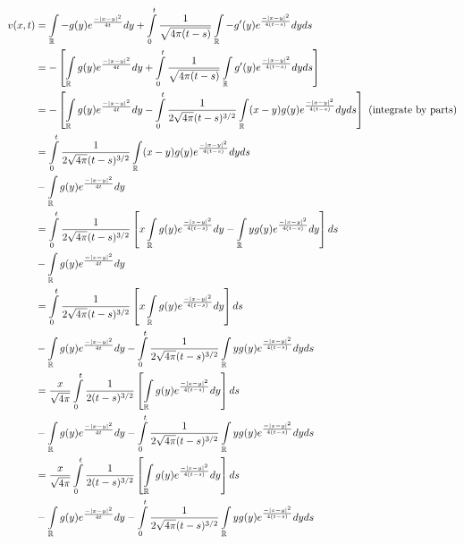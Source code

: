 \documentclass[a4paper,12pt]{article}
\begin{document}
\begin{align*}
v(x,t) &= \int\limits_{\mathbb{R}} -g(y)e^{\frac{-\left\lvert x-y \right\rvert^2}{4t}} dy +  \int\limits_0^t \frac{1}{\sqrt{4 \pi (t-s)}} \int\limits_{\mathbb{R}} -g'(y) e^{\frac{-\left\lvert x-y \right\rvert^2}{4(t-s)}} dy ds\\
&= -\left[\int\limits_{\mathbb{R}} g(y)e^{\frac{-\left\lvert x-y \right\rvert^2}{4t}} dy +  \int\limits_0^t \frac{1}{\sqrt{4 \pi (t-s)}} \int\limits_{\mathbb{R}} g'(y) e^{\frac{-\left\lvert x-y \right\rvert^2}{4(t-s)}} dy ds \right]\\
&= -\left[\int\limits_{\mathbb{R}} g(y)e^{\frac{-\left\lvert x-y \right\rvert^2}{4t}} dy -  \int\limits_0^t \frac{1}{2\sqrt{4 \pi }(t-s)^{3/2}} \int\limits_{\mathbb{R}} (x-y)g(y) e^{\frac{-\left\lvert x-y \right\rvert^2}{4(t-s)}} dy ds \right] \text{ (integrate by parts)}\\
&= \int\limits_0^t \frac{1}{2\sqrt{4 \pi }(t-s)^{3/2}} \int\limits_{\mathbb{R}} (x-y)g(y) e^{\frac{-\left\lvert x-y \right\rvert^2}{4(t-s)}} dy ds \\
&-\int\limits_{\mathbb{R}} g(y)e^{\frac{-\left\lvert x-y \right\rvert^2}{4t}} dy \\
&= \int\limits_0^t \frac{1}{2\sqrt{4 \pi }(t-s)^{3/2}} \left[x\int\limits_{\mathbb{R}} g(y) e^{\frac{-\left\lvert x-y \right\rvert^2}{4(t-s)}}dy - \int\limits_{\mathbb{R}} yg(y) e^{\frac{-\left\lvert x-y \right\rvert^2}{4(t-s)}} dy \right] ds \\
&-\int\limits_{\mathbb{R}} g(y)e^{\frac{-\left\lvert x-y \right\rvert^2}{4t}} dy \\
&= \int\limits_0^t \frac{1}{2\sqrt{4 \pi }(t-s)^{3/2}} \left[x\int\limits_{\mathbb{R}} g(y) e^{\frac{-\left\lvert x-y \right\rvert^2}{4(t-s)}}dy \right] ds \\
&-\int\limits_{\mathbb{R}} g(y)e^{\frac{-\left\lvert x-y \right\rvert^2}{4t}} dy - \int\limits_0^t \frac{1}{2\sqrt{4 \pi }(t-s)^{3/2}} \int\limits_{\mathbb{R}} yg(y) e^{\frac{-\left\lvert x-y \right\rvert^2}{4(t-s)}} dy ds \\
&= \frac{x}{\sqrt{4\pi}} \int\limits_0^t \frac{1}{2(t-s)^{3/2}} \left[\int\limits_{\mathbb{R}} g(y) e^{\frac{-\left\lvert x-y \right\rvert^2}{4(t-s)}}dy \right] ds \\
&-\int\limits_{\mathbb{R}} g(y)e^{\frac{-\left\lvert x-y \right\rvert^2}{4t}} dy - \int\limits_0^t \frac{1}{2\sqrt{4 \pi }(t-s)^{3/2}} \int\limits_{\mathbb{R}} yg(y) e^{\frac{-\left\lvert x-y \right\rvert^2}{4(t-s)}} dy ds \\
&= \frac{x}{\sqrt{4\pi}} \int\limits_0^t \frac{1}{2(t-s)^{3/2}} \left[\int\limits_{\mathbb{R}} g(y) e^{\frac{-\left\lvert x-y \right\rvert^2}{4(t-s)}}dy \right] ds \\
&-\int\limits_{\mathbb{R}} g(y)e^{\frac{-\left\lvert x-y \right\rvert^2}{4t}} dy - \int\limits_0^t \frac{1}{2\sqrt{4 \pi }(t-s)^{3/2}} \int\limits_{\mathbb{R}} yg(y) e^{\frac{-\left\lvert x-y \right\rvert^2}{4(t-s)}} dy ds \\
\end{align*} %
\end{document}
